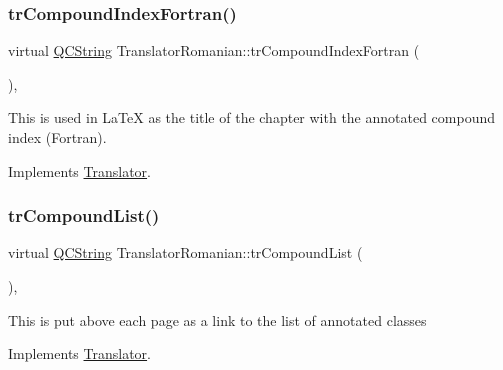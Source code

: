 \mbox{\label{class_translator_romanian_ab41becc10fb96bc438fa133dd8783b66}} 
\subsubsection{\texorpdfstring{trCompoundIndexFortran()}{trCompoundIndexFortran()}}
{\footnotesize\ttfamily virtual \mbox{\hyperlink{class_q_c_string}{Q\+C\+String}} Translator\+Romanian\+::tr\+Compound\+Index\+Fortran (\begin{DoxyParamCaption}{ }\end{DoxyParamCaption})\hspace{0.3cm}{\ttfamily [inline]}, {\ttfamily [virtual]}}

This is used in La\+TeX as the title of the chapter with the annotated compound index (Fortran). 

Implements \mbox{\hyperlink{class_translator}{Translator}}.

\mbox{\label{class_translator_romanian_a710b95f0e9cf339ed8133627e45a7fe6}} 
\subsubsection{\texorpdfstring{trCompoundList()}{trCompoundList()}}
{\footnotesize\ttfamily virtual \mbox{\hyperlink{class_q_c_string}{Q\+C\+String}} Translator\+Romanian\+::tr\+Compound\+List (\begin{DoxyParamCaption}{ }\end{DoxyParamCaption})\hspace{0.3cm}{\ttfamily [inline]}, {\ttfamily [virtual]}}

This is put above each page as a link to the list of annotated classes 

Implements \mbox{\hyperlink{class_translator}{Translator}}.

\mbox{\label{class_translator_romanian_ab28304e8e364c7bec0c2d791a312bd1e}} 

